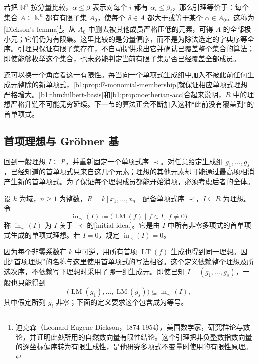 若把 \(\mathbb N^n\) 按分量比较，\(\alpha\leq\beta\) 表示对每个 \(i\) 都有 \(\alpha_i\leq\beta_i\)，那么引理等价于：每个集合 \(A\subseteq\mathbb N^n\) 都有有限子集 \(A_0\)，使每个 \(\beta\in A\) 都大于或等于某个 \(\alpha\in A_0\)。这称为[Dickson's lemma]\footnote{迪克森（Leonard Eugene Dickson，1874-1954），美国数学家，研究群论与数论，并证明此处所用的自然数向量有限性结论。这个引理把非负整数指数向量的逐坐标偏序转为有限生成性，是他研究多项式不变量时使用的有限性原理。}。从 \(A_0\) 中删去被其他成员严格压低的元素，可得 \(A\) 的全部极小元；它们仍为有限集。这里比较的是分量偏序，而不是为除法选定的字典序等全序。引理只保证有限子集存在，不自动提供求出它并确认已覆盖整个集合的算法；即使能够枚举这个集合，也未必能判定当前有限子集是否已经覆盖全部成员。

\ProseParagraphBreak
还可以换一个角度看这一有限性。每当向一个单项式生成组中加入不被此前任何生成元整除的新单项式，\cref{b1:prop:F-monomial-membership}就保证相应单项式理想严格增大。\cref{b1:thm:hilbert-basis}和\cref{b1:prop:noetherian-acc}合起来说明，\(R\) 中的理想严格升链不可能无穷延续。下一节的算法正会不断加入这种“此前没有覆盖到”的首单项式。

\subsection{首项理想与 Gröbner 基}
\label{b1:subsec:F02:02}

回到一般理想 \(I\subseteq R\)，并重新固定一个单项式序 \(\prec\)。对任意给定生成组 \(g_1,\ldots,g_s\)，已经知道的首单项式只来自这几个元素；理想的其他元素却可能通过最高项相消产生新的首单项式。为了保证每个理想成员都能开始消项，必须考虑后者的全体。

\begin{definition}\label{b1:def:F-initial-ideal}
	设 \(k\) 为域，\(n\geq1\) 为整数，\(R=k[x_1,\ldots,x_n]\) 配备单项式序 \(\prec\)，\(I\subseteq R\) 为理想。令
	\[
		\operatorname{in}_{\prec}(I) \coloneqq\bigl(\operatorname{LM}(f)\mid f\in I,\ f\ne0\bigr)
	\]
	称 \(\operatorname{in}_{\prec}(I)\) 为 \(I\) 关于 \(\prec\) 的[initial ideal]。它是由 \(I\) 中所有非零多项式的首单项式生成的单项式理想。若 \(I=0\)，规定 \(\operatorname{in}_{\prec}(I)=0\)。
\end{definition}


因为每个非零系数在 \(k\) 中可逆，用所有首项 \(\operatorname{LT}(f)\) 生成也得到同一理想。因此“首项理想”的名称与这里使用首单项式的写法相容。这个定义依赖整个理想及所选次序，不依赖写下理想时采用了哪一组生成元。即使已知 \(I=(g_1,\ldots,g_s)\)，一般也只能得到
\[
	\bigl(\operatorname{LM}(g_1),\ldots,\operatorname{LM}(g_s)\bigr) \subseteq\operatorname{in}_{\prec}(I),
\]
其中假定所列 \(g_i\) 非零；下面的定义要求这个包含成为等号。


